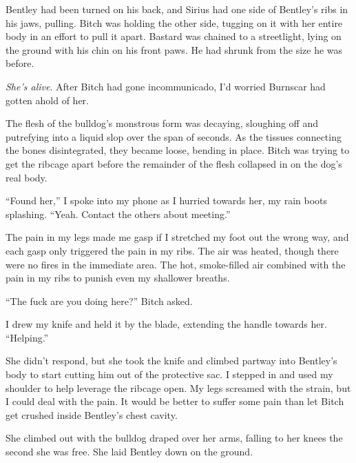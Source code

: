 





Bentley had been turned on his back, and Sirius had one side of Bentley's ribs in his jaws, pulling. Bitch was holding the other side, tugging on it with her entire body in an effort to pull it apart.  Bastard was chained to a streetlight, lying on the ground with his chin on his front paws.  He had shrunk from the size he was before.



\emph{She's alive}.  After Bitch had gone incommunicado, I'd worried Burnscar had gotten ahold of her.



The flesh of the bulldog's monstrous form was decaying, sloughing off and putrefying into a liquid slop over the span of seconds.  As the tissues connecting the bones disintegrated, they became loose, bending in place.  Bitch was trying to get the ribcage apart before the remainder of the flesh collapsed in on the dog's real body.



``Found her,'' I spoke into my phone as I hurried towards her, my rain boots splashing.  ``Yeah.  Contact the others about meeting.''



The pain in my legs made me gasp if I stretched my foot out the wrong way, and each gasp only triggered the pain in my ribs.  The air was heated, though there were no fires in the immediate area.  The hot, smoke-filled air combined with the pain in my ribs to punish even my shallower breaths.



``The fuck are you doing here?''  Bitch asked.



I drew my knife and held it by the blade, extending the handle towards her.  ``Helping.''



She didn't respond, but she took the knife and climbed partway into Bentley's body to start cutting him out of the protective sac.  I stepped in and used my shoulder to help leverage the ribcage open.  My legs screamed with the strain, but I could deal with the pain.  It would be better to suffer some pain than let Bitch get crushed inside Bentley's chest cavity.



She climbed out with the bulldog draped over her arms, falling to her knees the second she was free.  She laid Bentley down on the ground.



